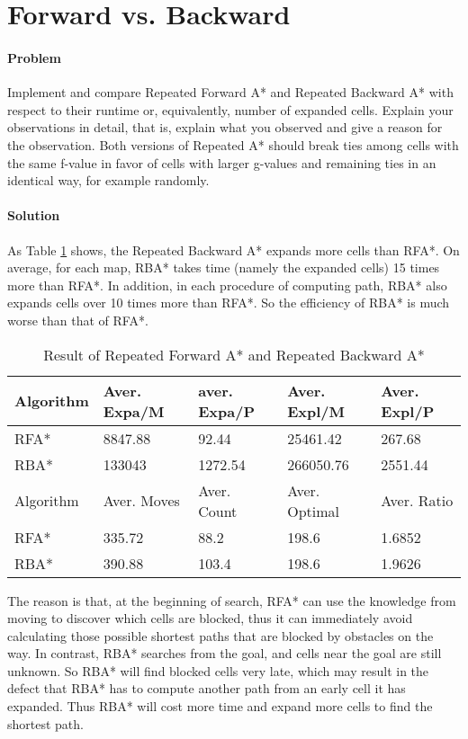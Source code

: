 \section{Forward vs. Backward}

\paragraph{Problem}
Implement and compare Repeated Forward A* and Repeated Backward A* with respect
to their runtime or, equivalently, number of expanded cells. Explain your
observations in detail, that is, explain what you observed and give a reason
for the observation. Both versions of Repeated A* should break ties among cells
with the same f-value in favor of cells with larger g-values and remaining ties
in an identical way, for example randomly.

\paragraph{Solution}

As Table \ref{tbl:rfa-rba} shows, the Repeated Backward A* expands more cells
than RFA*. On average, for each map, RBA* takes time (namely the expanded
cells) 15 times more than RFA*. In addition, in each procedure of computing 
path, RBA* also expands cells over 10 times more than RFA*. So the efficiency
of RBA* is much worse than that of RFA*.

\begin{table}[h!]
\centering
\caption{Result of Repeated Forward A* and Repeated Backward A*}
\begin{tabular}{|l|l|l|l|l|}
\hline
Algorithm & Aver. Expa/M & aver. Expa/P & Aver. Expl/M & Aver. Expl/P \\
\hline
RFA* & 8847.88 & 92.44 & 25461.42 & 267.68 \\
\hline
RBA* & 133043 & 1272.54 & 266050.76 & 2551.44 \\
\hhline{|=|=|=|=|=|}
Algorithm & Aver. Moves & Aver. Count & Aver. Optimal & Aver. Ratio \\
\hline
RFA* & 335.72 & 88.2 & 198.6 & 1.6852 \\
\hline
RBA* & 390.88 & 103.4 & 198.6 & 1.9626 \\
\hline
\end{tabular}
\label{tbl:rfa-rba}
\end{table}

The reason is that, at the beginning of search, RFA* can use the knowledge from 
moving to discover which cells are blocked, thus it can immediately avoid
calculating those possible shortest paths that are blocked by obstacles on the
way. In contrast, RBA* searches from the goal, and cells near the goal are
still unknown. So RBA* will find blocked cells very late, which may result in
the defect that RBA* has to compute another path from an early cell it has expanded. 
Thus RBA* will cost more time and expand more cells to find the shortest path.

